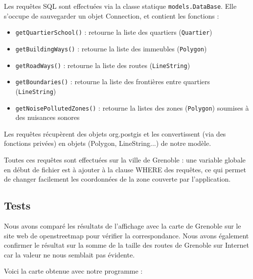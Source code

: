 \documentclass[12pt,a4paper]{article}
\begin{document}
Les requêtes SQL sont effectuées via la classe statique \verb?models.DataBase?. Elle s'occupe de sauvegarder un objet Connection, et contient les fonctions :
\begin{itemize}
	\item \verb?getQuartierSchool()? : retourne la liste des quartiers (\verb?Quartier?)
	\item \verb?getBuildingWays()? : retourne la liste des immeubles (\verb?Polygon?)
	\item \verb?getRoadWays()? : retourne la liste des routes (\verb?LineString?)
    \item \verb?getBoundaries()? : retourne la liste des frontières entre quartiers (\verb?LineString?)
    \item \verb?getNoisePollutedZones()? : retourne la listes des zones (\verb?Polygon?) soumises à des nuisances sonores
\end{itemize}

Les requêtes récupèrent des objets org.postgis et les convertissent (via des fonctions privées) en objets (Polygon, LineString...) de notre modèle.

Toutes ces requêtes sont effectuées sur la ville de Grenoble : une variable globale en début de fichier est à ajouter à la clause WHERE des requêtes, ce qui permet de changer facilement les coordonnées de la zone couverte par l'application.

\subsection*{Tests}

Nous avons comparé les résultats de l'affichage avec la carte de Grenoble sur le site web de openstreetmap pour vérifier la correspondance. Nous avons également confirmer le résultat sur la somme de la taille des routes de Grenoble sur Internet car la valeur ne nous semblait pas évidente.

\newpage
Voici la carte obtenue avec notre programme :
\end{document}
